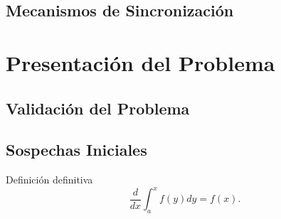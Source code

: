\subsection{Mecanismos de Sincronización}

\section{Presentación del Problema}

\subsection{Validación del Problema}

\subsection{Sospechas Iniciales}

\begin{defn} Definición definitiva $$\frac{d}{dx}\int_a^xf(y)dy=f(x).$$\end{defn}